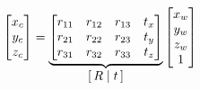 \begin{equation}
    \begin{bmatrix}
        x_c \\ y_c \\ z_c
    \end{bmatrix}
    =
    \underbrace{
        \begin{bmatrix}
            r_{11} & r_{12} & r_{13} & t_x \\
            r_{21} & r_{22} & r_{23} & t_y \\
            r_{31} & r_{32} & r_{33} & t_z \\
        \end{bmatrix}
    }_{\mathlarger{[\,R\;|\;t\,]}}
    \begin{bmatrix}
        x_w \\ y_w \\ z_w \\ 1
    \end{bmatrix}
\end{equation}



